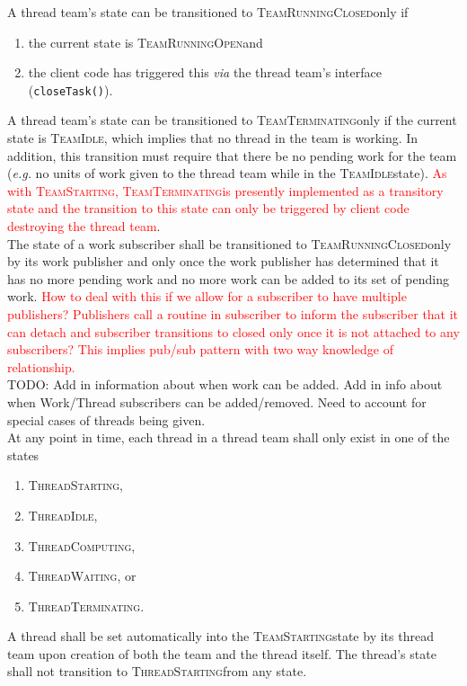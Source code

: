 \documentclass{article}
\newcommand{\TeamStarting}      {\textsc{TeamStarting}}
\newcommand{\TeamIdle}          {\textsc{TeamIdle}}
\newcommand{\TeamRunningOpen}   {\textsc{TeamRunningOpen}}
\newcommand{\TeamRunningClosed} {\textsc{TeamRunningClosed}}
\newcommand{\TeamTerminating}   {\textsc{TeamTerminating}}
\newcommand{\ThreadStarting}    {\textsc{ThreadStarting}}
\newcommand{\ThreadIdle}        {\textsc{ThreadIdle}}
\newcommand{\ThreadComputing}   {\textsc{ThreadComputing}}
\newcommand{\ThreadWaiting}     {\textsc{ThreadWaiting}}
\newcommand{\ThreadTerminating} {\textsc{ThreadTerminating}}
\begin{document}
A thread team's state can be transitioned to \TeamRunningClosed only if
\begin{enumerate}
\item{the current state is \TeamRunningOpen and}
\item{the client code has triggered this \textit{via} the thread team's
interface (\texttt{closeTask()}).}
\end{enumerate}

A thread team's state can be transitioned to \TeamTerminating only if the
current state is \TeamIdle, which implies that no thread in the team is working.
In addition, this transition must require that there be no pending work for the
team (\textit{e.g.} no units of work given to the thread team while in the
\TeamIdle state).  \textcolor{red}{As with \TeamStarting, \TeamTerminating is
presently implemented as a transitory state and the transition to this state can
only be triggered by client code destroying the thread team}.\\

The state of a work subscriber shall be transitioned to \TeamRunningClosed only
by its work publisher and only once the work publisher has determined that it
has no more pending work and no more work can be added to its set of pending
work.  \textcolor{red}{How to deal with this if we allow for a subscriber to
have multiple publishers?  Publishers call a routine in subscriber to inform the
subscriber that it can detach and subscriber transitions to closed only once it
is not attached to any subscribers?  This implies pub/sub pattern with two way
knowledge of relationship.}\\

TODO: Add in information about when work can be added.  Add in info about when
Work/Thread subscribers can be added/removed.  Need to account for special cases
of threads being given.\\


At any point in time, each thread in a thread team shall only exist in one of
the states
\begin{enumerate}
\item{\ThreadStarting,}
\item{\ThreadIdle,}
\item{\ThreadComputing,}
\item{\ThreadWaiting, or}
\item{\ThreadTerminating.}
\end{enumerate}

A thread shall be set automatically into the \TeamStarting state by its thread
team upon creation of both the team and the thread itself.  The thread's state
shall not transition to \ThreadStarting from any state. \\
\end{document}
